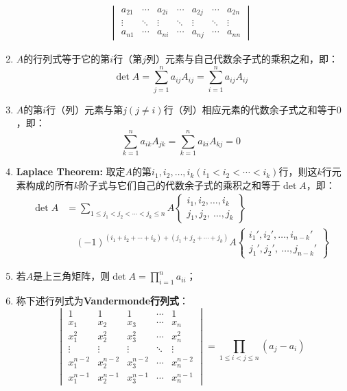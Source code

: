 \begin{property}
\begin{enumerate}
\begin{gather*}
\begin{vmatrix}
				a_{21} & \cdots & a_{2i} & \cdots & a_{2j} & \cdots & a_{2n} \\
				\vdots & \ddots & \vdots & \ddots & \vdots & \ddots & \vdots \\
				a_{n1} & \cdots & a_{ni} & \cdots & a_{nj} & \cdots & a_{nn}
			\end{vmatrix}
		\end{gather*}
		\item $A$的行列式等于它的第$i$行（第$j$列）元素与自己代数余子式的乘积之和，即：
		\begin{equation*}
			\det A=\sum_{j=1}^{n}a_{ij}A_{ij}=\sum_{i=1}^{n}a_{ij}A_{ij}
		\end{equation*}
		\item $A$的第$i$行（列）元素与第$j(j\ne i)$行（列）相应元素的代数余子式之和等于$0$，即：
		\begin{equation*}
			\sum_{k=1}^{n}a_{ik}A_{jk}=\sum_{k=1}^{n}a_{ki}A_{kj}=0
		\end{equation*}
		\item \textbf{Laplace Theorem:} 取定$A$的第$i_1,i_2,\dots,i_k(i_1<i_2<\cdots<i_k)$行，则这$k$行元素构成的所有$k$阶子式与它们自己的代数余子式的乘积之和等于$\det A$，即：
		\begin{align*}
			\det A&=\sum_{1\leqslant j_1<j_2<\cdots<j_k\leqslant n}A\left\{ \begin{array}{l}
				i_1,i_2,\dots,i_k \\
				j_1,j_2,\ \dots,j_k
			\end{array} \right\} \\
			&\quad(-1)^{(i_1+i_2+\cdots+i_k)+(j_1+j_2+\cdots+j_k)}A\left\{ \begin{array}{l}
				i_1',i_2',\dots,i_{n-k}' \\
				j_1',j_2',\ \dots,j_{n-k}'
			\end{array} \right\}
		\end{align*}
		\item 若$A$是上三角矩阵，则$\det A=\prod\limits_{i=1}^na_{ii}$；
		\item 称下述行列式为\textbf{Vandermonde行列式}：
		\begin{equation*}
			\begin{vmatrix}
				1 & 1 & 1 & \cdots & 1 \\
				x_1 & x_2 & x_3 & \cdots & x_n \\
				x_1^2 & x_2^2 & x_3^2 & \cdots & x_n^2 \\
				\vdots & \vdots & \vdots & \ddots & \vdots \\
				x_1^{n-2} & x_2^{n-2} & x_3^{n-2} & \cdots & x_n^{n-2} \\
				x_1^{n-1} & x_2^{n-1} & x_3^{n-1} & \cdots & x_n^{n-1}
			\end{vmatrix}=\prod_{1\leqslant i<j\leqslant n}(a_j-a_i)
		\end{equation*}
	\end{enumerate}
\end{property}
